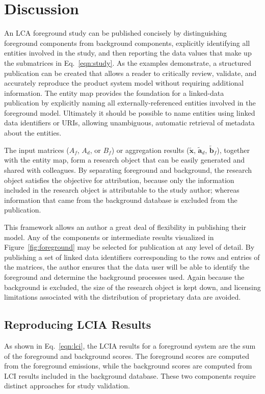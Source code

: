 \section{Discussion}

An LCA foreground study can be published concisely by distinguishing foreground components from background components, explicitly identifying all entities involved in the study, and then reporting the data values that make up the submatrices in Eq.~\ref{eqn:study}.  As the examples demonstrate, a structured publication can be created that allows a reader to critically review, validate, and accurately reproduce the product system model without requiring additional information.  The entity map provides the foundation for a linked-data publication by explicitly naming all externally-referenced entities involved in the foreground model.  Ultimately it should be possible to name entities using linked data identifiers or URIs, allowing unambiguous, automatic retrieval of metadata about the entities.

The input matrices ($A_f$, $A_d$, or $B_f$) or aggregation results ($\tilde{\mathbf{x}}$, $\tilde{\mathbf{a}}_d$, $\tilde{\mathbf{b}}_f$), together with the entity map, form a research object that can be easily generated and shared with colleagues.  By separating foreground and background, the research object satisfies the objective for attribution, because only the information included in the research object is attributable to the study author; whereas information that came from the background database is excluded from the publication.

This framework allows an author a great deal of flexibility in publishing their model.  Any of the components or intermediate results visualized in Figure~\ref{fig:foreground} may be selected for publication at any level of detail.  By publishing a set of linked data identifiers corresponding to the rows and entries of the matrices, the author ensures that the data user will be able to identify the foreground and determine the background processes used. Again because the background is excluded, the size of the research object is kept down, and licensing limitations associated with the distribution of proprietary data are avoided.


\subsection{Reproducing LCIA Results}

As shown in Eq.~\ref{eqn:lci}, the LCIA results for a foreground system are the sum of the foreground and background scores.  The foreground scores are computed from the foreground emissions, while the background scores are computed from LCI results included in the background database.  These two components require distinct approaches for study validation.

